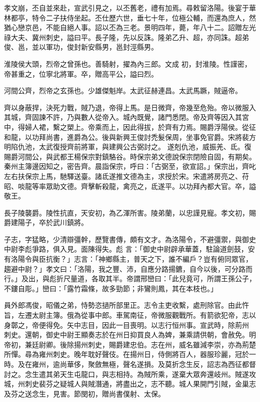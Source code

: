 \begin{pinyinscope}
 孝文崩，丕自並來赴，宣武引見之，以丕舊老，禮有加焉。尋敕留洛陽。後宴于華林都亭，特令二子扶侍坐起。丕仕歷六世，垂七十年，位極公輔，而還為庶人，然猶心戀京邑，不能自絕人事。詔以丕為三老。景明四年，薨，年八十二。詔贈左光祿大夫、冀州刺史，謚曰平。長子隆，先以反誅。隆弟乙升、超，亦同誅。超弟俊、邕，並以軍功，俊封新安縣男，邕封涇縣男。



 淮陵侯大頭，烈帝之曾孫也。善騎射，擢為內三郎。文成
 初，封淮陵。性謹密，帝甚重之，位寧北將軍。卒，贈高平公，謚曰烈。



 河間公齊，烈帝之玄孫也。少雄傑魁岸。太武征赫連昌。太武馬蹶，賊逼帝。



 齊以身蔽捍，決死力戰，賊乃退，帝得上馬。是日微齊，帝幾至危殆。帝以微服入其城，齊固諫不許，乃與數人從帝入。城內既覺，諸門悉閉。帝及齊等因入其宮中，得婦人裙，繫之槊上。帝乘而上，因此得拔，於齊有力焉。賜爵浮陽侯。從征和龍，以功拜尚書，進爵為公。後與新興王俊討禿髮保周，坐事免官爵。宋將裴方明陷仇池，太武復授齊前將軍，與建興公古弼討之。
 遂剋仇池，威振羌、氐。復賜爵河間公，與武都王楊保宗對鎮駱谷。時保宗弟文德說保宗閉險自固，有期矣。秦州主簿邊因知之，密告齊。晨詣保宗，呼曰：「古弼至，欲宣詔。」保宗出，齊叱左右扶保宗上馬，馳驛送臺。諸氐遂推文德為主，求授於宋。宋遣將房亮之、苻昭、啖龍等率眾助文德。齊擊斬殺龍，禽亮之，氐遂平。以功拜內都大官。卒，謚敬王。



 長子陵襲爵。陵性抗直，天安初，為乙渾所害。陵弟蘭，以忠謹見寵。孝文初，賜爵建陽子，卒於武川鎮將。



 子志，字猛略，少清辯彊幹，歷覽書傳，頗有文才。為洛陽令，不避彊禦，與御史中尉李彪爭路，俱入見。面陳得失。彪
 言：「御史中尉辟承華蓋，駐論道劍鼓，安有洛陽令與臣抗衡？」志言：「神鄉縣主，普天之下，誰不編戶？豈有俯同眾官，趨避中尉？」孝文曰：「洛陽，我之豐、沛，自應分路揚鑣，自今以後，可分路而行。」及出，與彪折尺量道，各取其半。帝謂邢巒曰：「此兒竟可，所謂王孫公子，不鏤自彫。」巒曰：「露竹霜條，故多勁節；非鸞則鳳，其在本枝也。」



 員外郎馮俊，昭儀之弟，恃勢恣撾所部里正。志令主吏收繫，處刑除官。由此忤旨，左遷太尉主簿。俄為從事中郎。車駕南征，帝微服觀戰所。有箭欲犯帝，志以身鄣之，帝便得免。矢中志目，因此一目喪明。以志行恒州事。宣武時，除荊州
 刺史。還朝，御史中尉王顯奏志於在州日抑買良人為婢，兼乘請供朝，會赦免。明帝初，兼廷尉卿。後除揚州刺史，賜爵建忠伯。志在州，威名雖減李崇，亦為荊楚所憚。尋為雍州刺史。晚年耽好聲伎。在揚州日，侍側將百人，器服珍麗，冠於一時。及在雍州，逾尚華侈，聚斂無極，聲名遂損。及莫折念生反，詔志為西征都督討之。念生遣其弟天生屯龍口，與志相持。為賊所乘，遂棄大眾奔還岐州。賊遂攻城，州刺史裴芬之疑城人與賊潛通，將盡出之，志不聽。城人果開門引賊，金巢志及芬之送念生，見害。節閔初，贈尚書僕射、太保。




\end{pinyinscope}
